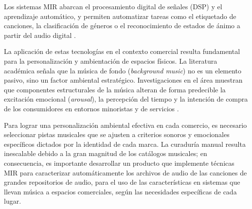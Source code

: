 Los sistemas MIR abarcan el procesamiento digital de señales (DSP) y el aprendizaje automático, y permiten automatizar tareas como el etiquetado de canciones, la clasificación de géneros o el reconocimiento de estados de ánimo a partir del audio digital \citep{Casey2008}.

La aplicación de estas tecnologías en el contexto comercial resulta fundamental para la personalización y ambientación de espacios físicos. La literatura académica señala que la música de fondo (\textit{background music}) no es un elemento pasivo, sino un factor ambiental estratégico. Investigaciones en el área muestran que componentes estructurales de la música alteran de forma predecible la excitación emocional (\textit{arousal}), la percepción del tiempo y la intención de compra de los consumidores en entornos minoristas y de servicios \citep{bruner1990music, garlin2006setting, roschk2017calibrating}. 

Para lograr una personalización ambiental efectiva en cada comercio, es necesario seleccionar pistas musicales que se ajusten a criterios sonoros y emocionales específicos dictados por la identidad de cada marca. La curaduría manual resulta inescalable debido a la gran magnitud de los catálogos musicales; en consecuencia, es importante desarrollar un producto que implemente técnicas MIR para caracterizar automáticamente los archivos de audio de las canciones de grandes repositorios de audio, para el uso de las características en sistemas que llevan música a espacios comerciales, según las necesidades específicas de cada lugar.




